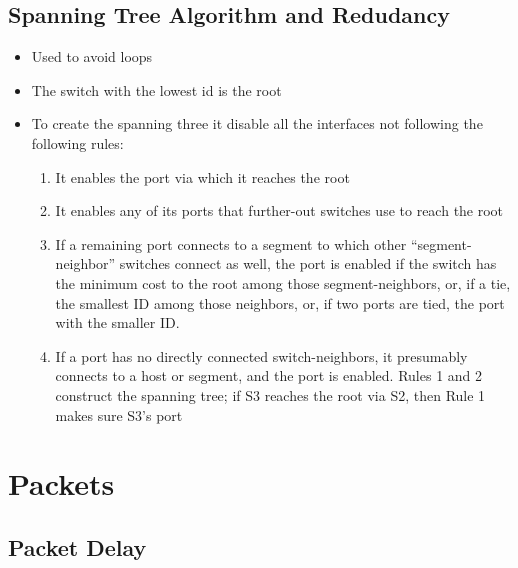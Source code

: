 \documentclass[11pt]{article}
\providecommand{\tightlist}{%
      \setlength{\itemsep}{0pt}\setlength{\parskip}{0pt}}
\begin{document}
    \subsection{Spanning Tree Algorithm and
Redudancy}\label{spanning-tree-algorithm-and-redudancy}

\begin{itemize}
\tightlist
\item
  Used to avoid loops
\item
  The switch with the lowest id is the root
\item
  To create the spanning three it disable all the interfaces not
  following the following rules:

  \begin{enumerate}
  \def\labelenumi{\arabic{enumi}.}
  \tightlist
  \item
    It enables the port via which it reaches the root
  \item
    It enables any of its ports that further-out switches use to reach
    the root
  \item
    If a remaining port connects to a segment to which other
    ``segment-neighbor'' switches connect as well, the port is enabled
    if the switch has the minimum cost to the root among those
    segment-neighbors, or, if a tie, the smallest ID among those
    neighbors, or, if two ports are tied, the port with the smaller ID.
  \item
    If a port has no directly connected switch-neighbors, it presumably
    connects to a host or segment, and the port is enabled. Rules 1 and
    2 construct the spanning tree; if S3 reaches the root via S2, then
    Rule 1 makes sure S3's port
  \end{enumerate}
\end{itemize}

    \section{Packets}\label{packets}

    \subsection{Packet Delay}\label{packet-delay}
\end{document}
